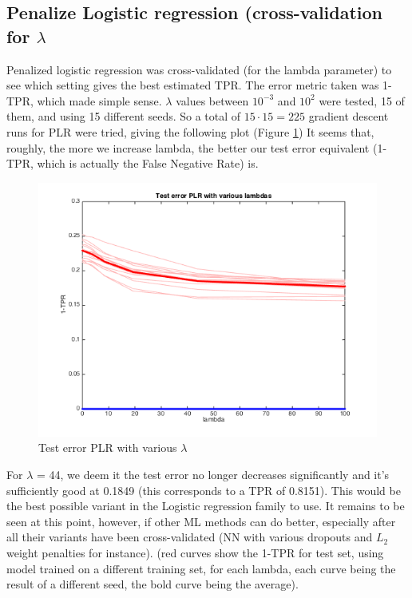 \documentclass{article} %
\begin{document}
\subsection{Penalize Logistic regression (cross-validation for $\lambda$}
Penalized logistic regression was cross-validated (for the lambda parameter) to see which setting gives the best estimated TPR. The error metric taken was 1-TPR, which made simple sense. $\lambda$ values between $10^{-3}$ and $10^2$ were tested, 15 of them, and using 15 different seeds. So a total of $15 \cdot 15=225$ gradient descent runs for PLR were tried, giving the following plot (Figure \ref{fig:TEPLR})
It seems that, roughly, the more we increase lambda, the better our test error equivalent (1-TPR, which is actually the False Negative Rate) is.
\begin{figure}[h!]
\centering
\includegraphics[scale=0.6]{images/PLRKCVplot.png}
\caption{Test error PLR with various $\lambda$}
\label{fig:TEPLR}
\end{figure} For $\lambda$ = 44, we deem it the test error no longer decreases significantly and it’s sufficiently good at 0.1849 (this corresponds to a TPR of 0.8151). This would be the best possible variant in the Logistic regression family to use. It remains to be seen at this point, however, if other ML methods can do better, especially after all their variants have been cross-validated (NN with various dropouts and $L_2$ weight penalties for instance). (red curves show the 1-TPR for test set, using model trained on a different training set, for each lambda, each curve being the result of a different seed, the bold curve being the average).
\end{document}
